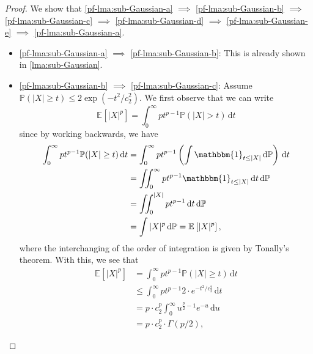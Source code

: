 \begin{proof}
	We show that \autoref{pf-lma:sub-Gaussian-a} \(\implies \) \autoref{pf-lma:sub-Gaussian-b} \(\implies \) \autoref{pf-lma:sub-Gaussian-c} \(\implies \) \autoref{pf-lma:sub-Gaussian-d} \(\implies \) \autoref{pf-lma:sub-Gaussian-e} \(\implies \) \autoref{pf-lma:sub-Gaussian-a}.
	\begin{itemize}
		\item \autoref{pf-lma:sub-Gaussian-a} \(\implies \) \autoref{pf-lma:sub-Gaussian-b}: This is already shown in \autoref{lma:sub-Gaussian}.
		\item \autoref{pf-lma:sub-Gaussian-b} \(\implies \) \autoref{pf-lma:sub-Gaussian-c}: Assume \(\mathbb{P} (\vert X \vert \geq t) \leq 2 \exp (-t^2 / c_2^2)\). We first observe that we can write
		      \[
			      \mathbb{E}_{}\left[\vert X \vert ^p \right] = \int_{0}^{\infty} p t^{p-1} \mathbb{P} (\vert X \vert > t) \,\mathrm{d}t
		      \]
		      since by working backwards, we have
		      \[
			      \begin{split}
				      \int_{0}^{\infty} p t^{p-1} \mathbb{P} (\vert X \vert \geq t) \,\mathrm{d}t
				      &= \int_{0}^{\infty} p t^{p-1} \left( \int \mathbbm{1}_{t \leq \vert X \vert } \,\mathrm{d} \mathbb{P} \right)  \,\mathrm{d}t \\
				      &= \iint_{0}^{\infty} p t^{p-1} \mathbbm{1}_{t \leq \vert X \vert } \,\mathrm{d}t \,\mathrm{d} \mathbb{P} \\
				      &= \iint_{0}^{\vert X \vert } p t^{p-1} \,\mathrm{d}t \,\mathrm{d} \mathbb{P} \\
				      &= \int \vert X \vert ^p \,\mathrm{d} \mathbb{P}
				      = \mathbb{E}_{}\left[\vert X \vert ^p \right],
			      \end{split}
		      \]
		      where the interchanging of the order of integration is given by Tonally's theorem. With this, we see that
		      \begin{align*}
			      \mathbb{E}_{}\left[\vert X \vert ^p \right]
			       & = \int_{0}^{\infty} p t^{p-1} \mathbb{P} (\vert X \vert \geq t) \,\mathrm{d}t                        \\
			       & \leq \int_{0}^{\infty} p t^{p-1} 2\cdot e^{-t^2 / c^2_2} \,\mathrm{d}t                               \\
			       & = p\cdot c_2^p \int_{0}^{\infty} u^{\frac{p}{2} - 1} e^{-u} \,\mathrm{d}u \tag*{\(u = t^2 / c_2^2\)} \\
			       & = p\cdot c^p_2 \cdot \Gamma (p / 2),
		      \end{align*}

\end{itemize}
\end{proof}
